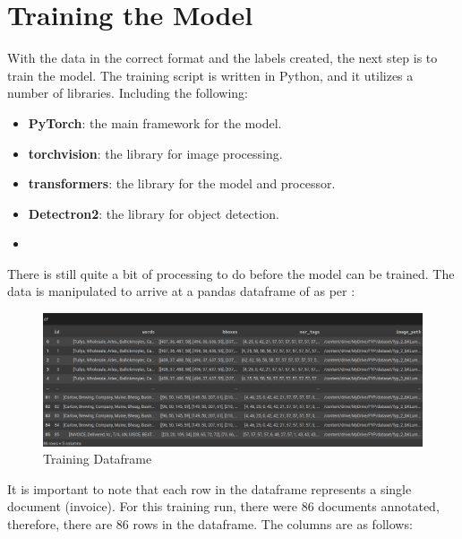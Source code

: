 \section{Training the Model}
With the data in the correct format and the labels created, the next step is to train the model. The training script
is written in Python, and it utilizes a number of libraries. Including the following:
\begin{itemize}
	\item \textbf{PyTorch}: the main framework for the model.
	\item \textbf{torchvision}: the library for image processing.
	\item \textbf{transformers}: the library for the model and processor.
	\item \textbf{Detectron2}: the library for object detection.
	\item
\end{itemize}
There is still quite a bit of processing to do before the model can be trained. The data is manipulated to arrive at a
pandas dataframe of as per :
\begin{figure}[H]
	\centering
	\includegraphics[width=1\textwidth]{figures/training_dataframe.png}
	\caption{Training Dataframe}
	\label{fig:training_dataframe}
\end{figure}
It is important to note that each row in the dataframe represents a single document (invoice). For this training run,
there were 86 documents annotated, therefore, there are 86 rows in the dataframe. The columns are as follows:
